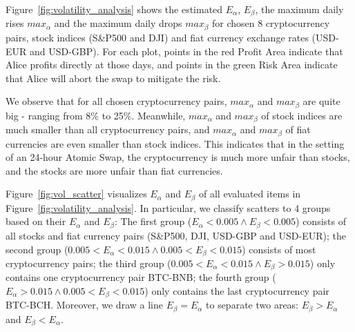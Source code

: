 Figure~\ref{fig:volatility_analysis} shows the estimated $E_\alpha$, $E_\beta$, the maximum daily rises $max_\alpha$ and the maximum daily drops $max_\beta$ for chosen 8 cryptocurrency pairs, stock indices (S\&P500 and DJI) and fiat currency exchange rates (USD-EUR and USD-GBP).
For each plot, points in the red Profit Area indicate that Alice profits directly at those days, and points in the green Risk Area indicate that Alice will abort the swap to mitigate the risk.

We observe that for all chosen cryptocurrency pairs, $max_\alpha$ and $max_\beta$ are quite big - ranging from 8\% to 25\%.
Meanwhile, $max_\alpha$ and $max_\beta$ of stock indices are much smaller than all cryptocurrency pairs,
and $max_\alpha$ and $max_\beta$ of fiat currencies are even smaller than stock indices.
This indicates that in the setting of an 24-hour Atomic Swap, the cryptocurrency is much more unfair than stocks, and the stocks are more unfair than fiat currencies.


Figure~\ref{fig:vol_scatter} visualizes $E_\alpha$ and $E_\beta$ of all evaluated items in Figure~\ref{fig:volatility_analysis}.
In particular, we classify scatters to 4 groups based on their $E_\alpha$ and $E_\beta$:
The first group ($E_\alpha < 0.005 \wedge E_\beta < 0.005$) consists of all stocks and fiat currency pairs (S\&P500, DJI, USD-GBP and USD-EUR);
the second group ($0.005 < E_\alpha < 0.015 \wedge 0.005 < E_\beta < 0.015$) consists of most cryptocurrency pairs;
the third group ($0.005 < E_\alpha < 0.015 \wedge E_\beta > 0.015$) only contains one cryptocurrency pair BTC-BNB;
the fourth group ($E_\alpha > 0.015 \wedge 0.005 < E_\beta < 0.015$) only contains the last cryptocurrency pair BTC-BCH.
Moreover, we draw a line $E_\beta = E_\alpha$ to separate two areas: $E_\beta > E_\alpha$ and $E_\beta < E_\alpha$.

